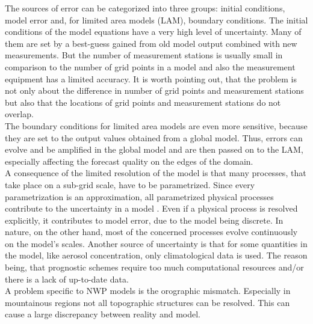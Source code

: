 The sources of error can be categorized into three groups: initial conditions, model error and, for limited area models (LAM), boundary conditions.
The initial conditions of the model equations have a very high level of uncertainty. Many of them are set by a best-guess gained from old model output combined with new measurements. But the number of measurement stations is usually small in comparison to the number of grid points in a model and also the measurement equipment has a limited accuracy. It is worth pointing out, that the problem is not only about the difference in number of grid points and measurement stations but also that the locations of grid points and measurement stations do not overlap. \\
The boundary conditions for limited area models are even more sensitive, because they are set to the output values obtained from a global model. Thus, errors can evolve and be amplified in the global model and are then passed on to the LAM, especially affecting the forecast quality on the edges of the domain.\\
A consequence of the limited resolution of the model is that many processes, that take place on a sub-grid scale, have to be parametrized.
Since every parametrization is an approximation, all parametrized physical processes contribute to the uncertainty in a model \cite{leutbecher2008ensemble}.
Even if a physical process is resolved explicitly, it contributes to model error, due to the model being discrete. In nature, on the other hand, most of the concerned processes evolve continuously on the model's scales. 
Another source of uncertainty is that for some quantities in the model, like aerosol concentration, only climatological data is used. The reason being, that  prognostic schemes require too much computational resources and/or there is a lack of up-to-date data. \\
A problem specific to NWP models is the orographic mismatch. Especially in mountainous regions not all topographic structures can be resolved. This can cause a large discrepancy between reality and model.\\


